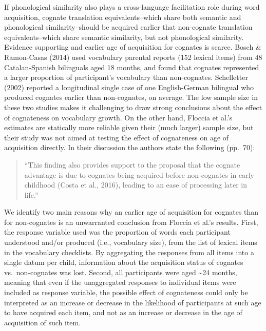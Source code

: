 \documentclass[
  letterpaper,
  DIV=11,
  numbers=noendperiod]{scrartcl}
\begin{document}
If phonological similarity also plays a cross-language facilitation role
during word acquisition, cognate translation equivalents--which share
both semantic and phonological similarity--should be acquired earlier
that non-cognate translation equivalents--which share semantic
similarity, but not phonological similarity. Evidence supporting and
earlier age of acquisition for cognates is scarce. Bosch \& Ramon-Casas
(2014) used vocabulary parental reports (152 lexical items) from 48
Catalan-Spanish bilinguals aged 18 months, and found that cognates
represented a larger proportion of participant's vocabulary than
non-cognates. Schelletter (2002) reported a longitudinal single case of
one English-German bilingual who produced cognates earlier than
non-cognates, on average. The low sample size in these two studies makes
it challenging to draw strong conclusions about the effect of
cognateness on vocabulary growth. On the other hand, Floccia et al.'s
estimates are statically more reliable given their (much larger) sample
size, but their study was not aimed at testing the effect of cognateness
on age of acquisition directly. In their discussion the authors state
the following (pp.~70):

\begin{quote}
``This finding also provides support to the proposal that the cognate
advantage is due to cognates being acquired before non-cognates in early
childhood (Costa et al., 2016), leading to an ease of processing later
in life.''
\end{quote}

We identify two main reasons why an earlier age of acquisition for
cognates than for non-cognates is an unwarranted conclusion from Floccia
et al.'s results. First, the response variable used was the proportion
of words each participant understood and/or produced (i.e., vocabulary
size), from the list of lexical items in the vocabulary checklists. By
aggregating the responses from all items into a single datum per child,
information about the acquisition status of cognates vs.~non-cognates
was lost. Second, all participants were aged \textasciitilde24 months,
meaning that even if the unaggregated responses to individual items were
included as response variable, the possible effect of cognateness could
only be interpreted as an increase or decrease in the likelihood of
participants at such age to have acquired each item, and not as an
increase or decrease in the age of acquisition of such item.
\end{document}
